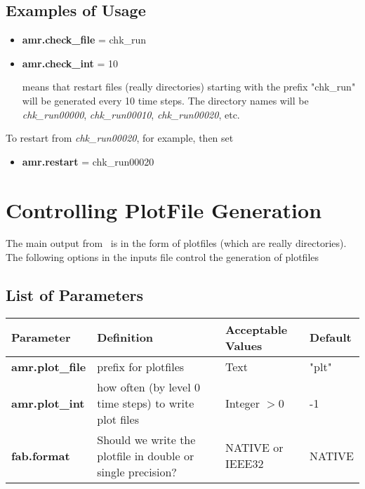 \subsection{Examples of Usage}

\begin{itemize}

\item {\bf amr.check\_file} = chk\_run
\item {\bf amr.check\_int} = 10

means that restart files (really directories) starting with the prefix "chk\_run" will be
generated every 10 time steps.  The directory names will be {\it chk\_run00000}, 
{\it chk\_run00010}, {\it chk\_run00020}, etc.

\end{itemize}

To restart from {\it chk\_run00020}, for example, then set 

\begin{itemize}
\item {\bf amr.restart} = chk\_run00020
\end{itemize}

\section{Controlling PlotFile Generation}
\label{sec:PlotFiles}
The main output from \mfix\ is in the form of plotfiles (which are really directories).
The following options in the inputs file control the generation of plotfiles 

\subsection{List of Parameters}

\begin{table*}[h]
\begin{scriptsize}
\begin{center}
\begin{tabular}{|l|l|l|l|} \hline
Parameter & Definition & Acceptable Values &Default\\
\hline
{\bf amr.plot\_file} & prefix for plotfiles & Text & "plt" \\
{\bf amr.plot\_int}  & how often (by level 0 time steps) to write plot files & Integer $> 0$ & -1  \\
{\bf fab.format}     & Should we write the plotfile in double or single precision? & NATIVE or IEEE32 & NATIVE \\
\hline
\end{tabular}
\end{center}
\end{scriptsize}
\end{table*}

